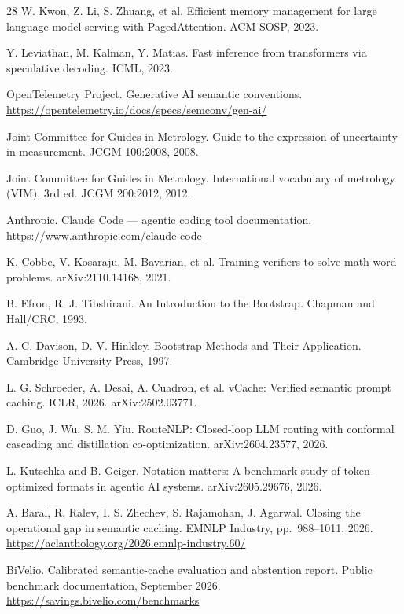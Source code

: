 \documentclass[11pt,a4paper]{article}
\begin{document}
\begin{thebibliography}{28}
 W. Kwon, Z. Li, S. Zhuang, et al. Efficient memory management for large language
model serving with PagedAttention. ACM SOSP, 2023.

 Y. Leviathan, M. Kalman, Y. Matias. Fast inference from transformers via
speculative decoding. ICML, 2023.

 OpenTelemetry Project. Generative AI semantic conventions.
\url{https://opentelemetry.io/docs/specs/semconv/gen-ai/}

 Joint Committee for Guides in Metrology. Guide to the expression of
uncertainty in measurement. JCGM 100:2008, 2008.

 Joint Committee for Guides in Metrology. International vocabulary of metrology
(VIM), 3rd ed. JCGM 200:2012, 2012.

 Anthropic. Claude Code --- agentic coding tool documentation.
\url{https://www.anthropic.com/claude-code}

 K. Cobbe, V. Kosaraju, M. Bavarian, et al. Training verifiers to solve math word
problems. arXiv:2110.14168, 2021.

 B. Efron, R. J. Tibshirani. An Introduction to the Bootstrap. Chapman and
Hall/CRC, 1993.

 A. C. Davison, D. V. Hinkley. Bootstrap Methods and Their Application.
Cambridge University Press, 1997.

 L. G. Schroeder, A. Desai, A. Cuadron, et al. vCache: Verified semantic prompt
caching. ICLR, 2026. arXiv:2502.03771.

 D. Guo, J. Wu, S. M. Yiu. RouteNLP: Closed-loop LLM routing with conformal
cascading and distillation co-optimization. arXiv:2604.23577, 2026.

 L. Kutschka and B. Geiger. Notation matters: A benchmark study of
token-optimized formats in agentic AI systems. arXiv:2605.29676, 2026.

 A. Baral, R. Ralev, I. S. Zhechev, S. Rajamohan, J. Agarwal. Closing the
operational gap in semantic caching. EMNLP Industry, pp.~988--1011, 2026.
\url{https://aclanthology.org/2026.emnlp-industry.60/}

 BiVelio. Calibrated semantic-cache evaluation and abstention report. Public
benchmark documentation, September 2026. \url{https://savings.bivelio.com/benchmarks}
\end{thebibliography}
\end{document}
